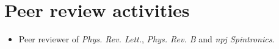 \documentclass[a4paper,11pt]{article}
\makeatletter
\newcommand{\resumeProject}[4]{
\vspace{0.5mm}\item
    \begin{tabular*}{0.98\textwidth}[t]{l@{\extracolsep{\fill}}r}
        \textbf{#1} & \textit{\footnotesize{#3}} \\
        \footnotesize{\textit{#2}} & \footnotesize{#4}
    \end{tabular*}
    \vspace{-2.4mm}
}
\newcommand{\resumeSubHeadingListStart}{\begin{itemize}[leftmargin=*,labelsep=1mm]}
\newcommand{\resumeItemListStart}{\begin{itemize}[leftmargin=*,labelsep=1mm,itemsep=0.5mm]}
\newcommand{\resumeItemListEnd}{\end{itemize}\vspace{-2mm}}
\makeatother
\begin{document}
\section{\textbf{Peer review activities}}
\resumeItemListStart
\item Peer reviewer of \textit{Phys. Rev. Lett.}, \textit{Phys. Rev. B} and \textit{npj Spintronics}. 
\resumeItemListEnd







\end{document}
